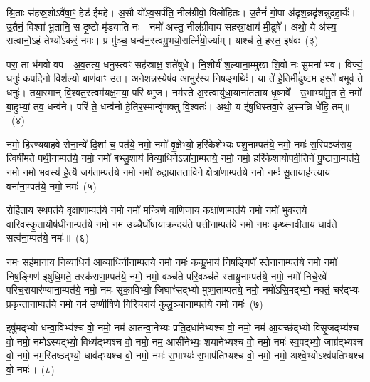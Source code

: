 श्रि॒ताः स॑हस्र॒शो\-ऽवै॑षा॒ꣳ॒ हेड॑ ईमहे। अ॒सौ यो॑\-ऽव॒सर्प॑ति॒ नील॑ग्रीवो॒ विलो॑हितः। उ॒तैनं॑ गो॒पा अ॑दृश॒न्नदृ॑शन्नुदहा॒र्यः॑। उ॒तैनं॒ विश्वा॑ भू॒तानि॒ स दृ॒ष्टो मृ॑डयाति नः। नमो॑ अस्तु॒ नील॑ग्रीवाय सहस्रा॒क्षाय॑ मी॒ढुषे᳚। अथो॒ ये अ॑स्य॒ सत्वा॑नो॒\-ऽहं तेभ्यो॑\-ऽकरं॒ नमः॑। प्र मु॑ञ्च॒ धन्व॑न॒स्त्वमु॒भयो॒रार्त्नि॑यो॒र्ज्याम्। याश्च॑ ते॒ हस्त॒ इष॑वः~(३)

परा॒ ता भ॑गवो वप। अ॒व॒तत्य॒ धनु॒स्त्वꣳ सह॑स्राक्ष॒ शते॑षुधे। नि॒शीर्य॑ श॒ल्याना॒म्मुखा॑ शि॒वो नः॑ सु॒मना॑ भव। विज्यं॒ धनुः॑ कप॒र्दिनो॒ विश॑ल्यो॒ बाण॑वाꣳ उ॒त। अने॑शन्न॒स्येष॑व आ॒भुर॑स्य निष॒ङ्गथिः॑। या ते॑ हे॒तिर्मी॑ढुष्टम॒ हस्ते॑ ब॒भूव॑ ते॒ धनुः॑। तया॒स्मान् वि॒श्वत॒स्त्वम॑यक्ष॒मया॒ परि॑ ब्भुज। नम॑स्ते अ॒स्त्वायु॑धा॒याना॑तताय धृ॒ष्णवे᳚। उ॒भाभ्या॑मु॒त ते॒ नमो॑ बा॒हुभ्यां॒ तव॒ धन्व॑ने। परि॑ ते॒ धन्व॑नो हे॒तिर॒स्मान्वृ॑णक्तु वि॒श्वतः॑। अथो॒ य इ॑षु॒धिस्तवा॒रे अ॒स्मन्नि धे॑हि॒ तम्॥~(४)

{\anuvakamend[{हस्ते॑ दि॒क्ष्विष॑व उ॒भाभ्यां॒ द्वाविꣳ॑शतिश्च}]}%

नमो॒ हिर॑ण्यबाहवे सेना॒न्ये॑ दि॒शां च॒ पत॑ये॒ नमो॒ नमो॑ वृ॒क्षेभ्यो॒ हरि॑केशेभ्यः पशू॒नाम्पत॑ये॒ नमो॒ नमः॑ स॒स्पिञ्ज॑राय॒ त्विषी॑मते पथी॒नाम्पत॑ये॒ नमो॒ नमो॑ बभ्लु॒शाय॑ विव्या॒धिने\-ऽन्ना॑ना॒म्पत॑ये॒ नमो॒ नमो॒ हरि॑केशायोपवी॒तिने॑ पु॒ष्टाना॒म्पत॑ये॒ नमो॒ नमो॑ भ॒वस्य॑ हे॒त्यै जग॑ता॒म्पत॑ये॒ नमो॒ नमो॑ रु॒द्राया॑तता॒विने॒ क्षेत्रा॑णा॒म्पत॑ये॒ नमो॒ नमः॑ सू॒तायाह॑न्त्याय॒ वना॑ना॒म्पत॑ये॒ नमो॒ नमः॑~(५)

रोहि॑ताय स्थ॒पत॑ये वृ॒क्षाणा॒म्पत॑ये॒ नमो॒ नमो॑ म॒न्त्रिणे॑ वाणि॒जाय॒ कक्षा॑णा॒म्पत॑ये॒ नमो॒ नमो॑ भुव॒न्तये॑ वारिवस्कृ॒तायौष॑धीना॒म्पत॑ये॒ नमो॒ नम॑ उ॒च्चैर्घो॑षायाक्र॒न्दय॑ते पत्ती॒नाम्पत॑ये॒ नमो॒ नमः॑ कृथ्स्नवी॒ताय॒ धाव॑ते॒ सत्व॑ना॒म्पत॑ये॒ नमः॑॥~(६)

{\anuvakamend[{वना॑ना॒म्पत॑ये॒ नमो॒ नम॒ एका॒न्नत्रि॒ꣳ॒शच्च॑}]}%

नमः॒ सह॑मानाय निव्या॒धिन॑ आव्या॒धिनी॑ना॒म्पत॑ये॒ नमो॒ नमः॑ ककु॒भाय॑ निष॒ङ्गिणे᳚ स्ते॒नाना॒म्पत॑ये॒ नमो॒ नमो॑ निष॒ङ्गिण॑ इषुधि॒मते॒ तस्क॑राणा॒म्पत॑ये॒ नमो॒ नमो॒ वञ्च॑ते परि॒वञ्च॑ते स्तायू॒नाम्पत॑ये॒ नमो॒ नमो॑ निचे॒रवे॑ परिच॒रायार॑ण्याना॒म्पत॑ये॒ नमो॒ नमः॑ सृका॒विभ्यो॒ जिघाꣳ॑सद्भ्यो मुष्ण॒ताम्पत॑ये॒ नमो॒ नमो॑\-ऽसि॒मद्भ्यो॒ नक्तं॒ चर॑द्भ्यः प्रकृ॒न्ताना॒म्पत॑ये॒ नमो॒ नम॑ उष्णी॒षिणे॑ गिरिच॒राय॑ कुलु॒ञ्चाना॒म्पत॑ये॒ नमो॒ नमः॑~(७)

इषु॑मद्भ्यो धन्वा॒विभ्य॑श्च वो॒ नमो॒ नम॑ आतन्वा॒नेभ्यः॑ प्रति॒दधा॑नेभ्यश्च वो॒ नमो॒ नम॑ आ॒यच्छ॑द्भ्यो विसृ॒जद्भ्य॑श्च वो॒ नमो॒ नमो\-ऽस्य॑द्भ्यो॒ विध्य॑द्भ्यश्च वो॒ नमो॒ नम॒ आसी॑नेभ्यः॒ शया॑नेभ्यश्च वो॒ नमो॒ नमः॑ स्व॒पद्भ्यो॒ जाग्र॑द्भ्यश्च वो॒ नमो॒ नम॒स्तिष्ठ॑द्भ्यो॒ धाव॑द्भ्यश्च वो॒ नमो॒ नमः॑ स॒भाभ्यः॑ स॒भाप॑तिभ्यश्च वो॒ नमो॒ नमो॒ अश्वे॒भ्यो\-ऽश्व॑पतिभ्यश्च वो॒ नमः॑॥~(८)

